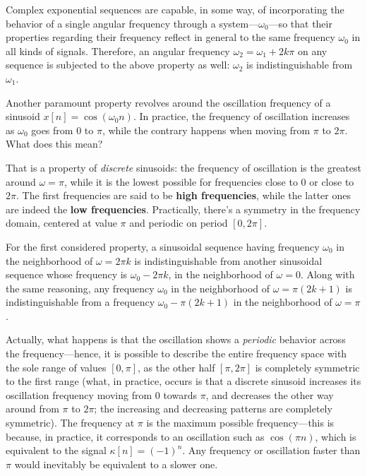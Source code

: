\documentclass[\documentfontsize, twocolumn]{\classname}
\begin{document}
Complex exponential sequences are capable, in some way, of incorporating the behavior of a single angular frequency through a system---$\omega_0$---so that their properties regarding their frequency reflect in general to the same frequency $\omega_0$ in all kinds of signals. Therefore, an angular frequency $\omega_2 = \omega_1 + 2k \pi$ on any sequence is subjected to the above property as well: $\omega_2$ is indistinguishable from $\omega_1$.

Another paramount property revolves around the oscillation frequency of a sinusoid $x[n]=\cos{(\omega_0 n)}$. In practice, the frequency of oscillation increases as $\omega_0$ goes from $0$ to $\pi$, while the contrary happens when moving from $\pi$ to $2\pi$. What does this mean?

That is a property of \emph{discrete} sinusoids: the frequency of oscillation is the greatest around $\omega=\pi$, while it is the lowest possible for frequencies close to $0$ or close to $2\pi$. The first frequencies are said to be \textbf{high frequencies}, while the latter ones are indeed the \textbf{low frequencies}. Practically, there's a symmetry in the frequency domain, centered at value $\pi$ and periodic on period $[0, 2\pi]$.

For the first considered property, a sinusoidal se\-quen\-ce having frequency $\omega_0$ in the neighborhood of $\omega=2\pi k$ is indistinguishable from another sinusoidal se\-quen\-ce whose frequency is $\omega_0 - 2 \pi k$, in the neighborhood of $\omega = 0$. Along with the same reasoning, any frequency $\omega_0$ in the neighborhood of $\omega = \pi (2k + 1)$ is indistinguishable from a frequency $\omega_0 - \pi(2k + 1)$ in the neighborhood of $\omega = \pi$.

Actually, what happens is that the oscillation shows a \emph{periodic} behavior across the frequency---hence, it is possible to describe the entire frequency space with the sole range of values $[0, \pi]$, as the other half $[\pi, 2\pi]$ is completely symmetric to the first range (what, in practice, occurs is that a discrete sinusoid increases its oscillation frequency moving from $0$ towards $\pi$, and decreases the other way around from $\pi$ to $2\pi$; the increasing and decreasing patterns are completely symmetric). The frequency at $\pi$ is the maximum possible frequency---this is because, in practice, it corresponds to an oscillation such as $\cos{(\pi n)}$, which is equivalent to the signal $\kappa[n] = (-1)^n$. Any frequency or oscillation faster than $\pi$ would inevitably be equivalent to a slower one.
\end{document}
